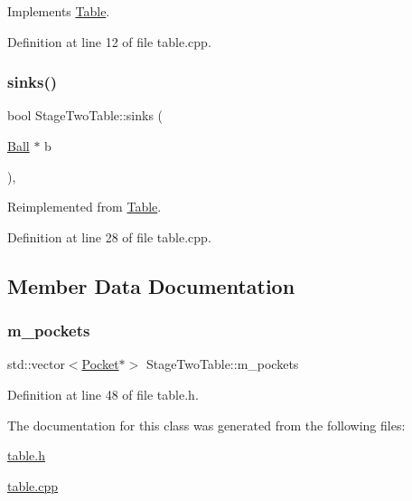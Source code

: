 Implements \mbox{\hyperlink{class_table_a827dac18920a95b3e0ef006183514654}{Table}}.



Definition at line 12 of file table.\+cpp.

\mbox{\label{class_stage_two_table_a3e015671be449da741adaf86e00ec844}} 
\subsubsection{\texorpdfstring{sinks()}{sinks()}}
{\footnotesize\ttfamily bool Stage\+Two\+Table\+::sinks (\begin{DoxyParamCaption}\item[{\mbox{\hyperlink{class_ball}{Ball}} $\ast$}]{b }\end{DoxyParamCaption})\hspace{0.3cm}{\ttfamily [override]}, {\ttfamily [virtual]}}



Reimplemented from \mbox{\hyperlink{class_table_ab3eb192b2a06e26349d651e4e6de063a}{Table}}.



Definition at line 28 of file table.\+cpp.



\subsection{Member Data Documentation}
\mbox{\label{class_stage_two_table_aba6026e62b3894b57264b080e6a72b75}} 
\subsubsection{\texorpdfstring{m\+\_\+pockets}{m\_pockets}}
{\footnotesize\ttfamily std\+::vector$<$\mbox{\hyperlink{class_pocket}{Pocket}}$\ast$$>$ Stage\+Two\+Table\+::m\+\_\+pockets\hspace{0.3cm}{\ttfamily [protected]}}



Definition at line 48 of file table.\+h.



The documentation for this class was generated from the following files\+:\begin{DoxyCompactItemize}
\item 
\mbox{\hyperlink{table_8h}{table.\+h}}\item 
\mbox{\hyperlink{table_8cpp}{table.\+cpp}}\end{DoxyCompactItemize}
